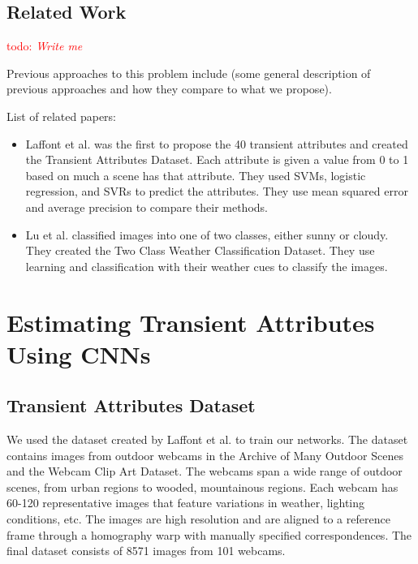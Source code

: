 \documentclass{article}
\newcommand{\todo}[1]{\textcolor{red}{todo: {\em #1}}}
\begin{document}
\subsection{Related Work}

\todo{Write me}

Previous approaches to this problem include (some general description
of previous approaches and how they compare to what we propose).

List of related papers:
\begin{itemize}

	\item Laffont\cite{Laffont14} et al. was the first to propose the 40
		transient attributes and created the Transient Attributes Dataset.
		Each attribute is given a value from 0 to 1 based on much a scene
		has that attribute. 	They used SVMs, logistic regression, and SVRs 
		to predict the attributes.  They use mean squared error and average 
		precision to compare their methods.

	\item Lu\cite{lutwoclass} et al. classified images into one of two 
		classes, either sunny or cloudy.  They created the Two Class 
		Weather Classification Dataset.  They use learning and classification
		with their weather cues to classify the images. 

\end{itemize}

\section{Estimating Transient Attributes Using CNNs}

\subsection{Transient Attributes Dataset}
\indent

We used the dataset created by Laffont\cite{Laffont14} et al. to train our 
networks. The dataset contains images from outdoor webcams in the  
Archive of Many Outdoor Scenes\cite{jacobs07amos} and the Webcam Clip Art 
Dataset\cite{lalondesig09}.  The webcams span a wide range of outdoor scenes,
from urban regions to wooded, mountainous regions. Each webcam has 60-120 
representative images that feature variations in weather, lighting conditions, 
etc.  The images are high resolution and are aligned to a reference frame 
through a homography warp with manually specified correspondences.  The final
dataset consists of 8571 images from 101 webcams.
\end{document}
